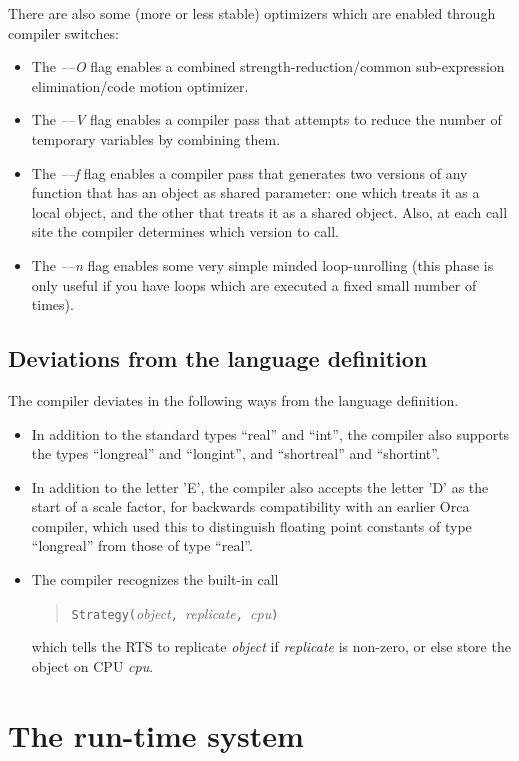 \documentclass[10pt]{article}
\begin{document}
There are also some (more or less stable) optimizers which are enabled
through compiler switches:
\begin{itemize}
\item
The {\em {\em --}--O} flag enables a combined strength-reduction/common
sub-expression elimination/code motion optimizer.
\item
The {\em {\em --}--V} flag enables a compiler pass that attempts to reduce
the number of temporary variables by combining them.
\item
The {\em {\em --}--f} flag enables a compiler pass that generates two
versions of any function that has an object as shared parameter: one which
treats it as a local object, and the other that treats it as a shared object.
Also, at each call site the compiler determines which version to call.
\item
The {\em {\em --}--n} flag enables some very simple minded loop-unrolling
(this phase is only useful if you have loops which are executed a fixed
small number of times).
\end{itemize}

\subsection{Deviations from the language definition}

The compiler deviates in the following ways from the language definition.

\begin{itemize}
\item
In addition to the standard types ``real'' and ``int'',
the compiler also supports
the types ``longreal'' and ``longint'', and
``shortreal'' and ``shortint''.
\item
In addition to the letter 'E', the compiler also accepts the letter 'D' as the
start of a scale factor, for backwards compatibility with an earlier
Orca compiler, which used this to distinguish floating point constants of
type ``longreal'' from those of type ``real''.
\item
The compiler recognizes the built-in call
\begin{quote}
\verb+Strategy(+{\em object}\verb+, +{\em replicate}\verb+, +{\em cpu}\verb+)+
\end{quote}
which tells the RTS to replicate {\em object} if {\em replicate} is non-zero,
or else store the object on CPU {\em cpu}.
\end{itemize}

\section{The run-time system}\label{sec:rts}
\end{document}
